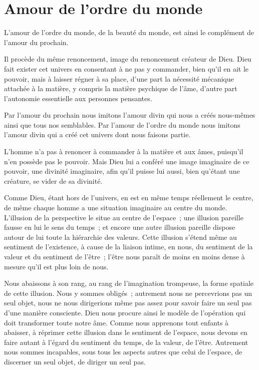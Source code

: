 \documentclass[french,twoside]{book} %
\begin{document}
\section[Amour de l’ordre du monde]{Amour de l’ordre du monde}
\noindent L'amour de l'ordre du monde, de la beauté du monde, est ainsi le complément de l'amour du prochain.\par
Il procède du même renoncement, image du renoncement créateur de Dieu. Dieu fait exister cet univers en consentant à ne pas y commander, bien qu'il en ait le pouvoir, mais à laisser régner à sa place, d'une part la nécessité mécanique attachée à la matière, y compris la matière psychique de l'âme, d'autre part l'autonomie essentielle aux personnes pensantes.\par
Par l'amour du prochain nous imitons l'amour divin qui nous a créés nous-mêmes ainsi que tous nos semblables. Par l'amour de l'ordre du monde nous imitons l'amour divin qui a créé cet univers dont nous faisons partie.\par
L'homme n'a pas à renoncer à commander à la matière et aux âmes, puisqu'il n'en possède pas le pouvoir. Mais Dieu lui a conféré une image imaginaire de ce pouvoir, une divinité imaginaire, afin qu'il puisse lui aussi, bien qu'étant une créature, se vider de sa divinité.\par
Comme Dieu, étant hors de l'univers, en est en même temps réellement le centre, de même chaque homme a une situation imaginaire au centre du monde. L'illusion de la perspective le situe au centre de l'espace ; une illusion pareille fausse en lui le sens du temps ; et encore une autre illusion pareille dispose autour de lui toute la hiérarchie des valeurs. Cette illusion s'étend même au sentiment de l'existence, à cause de la liaison intime, en nous, du sentiment de la valeur et du sentiment de l'être ; l'être nous paraît de moins en moins dense à mesure qu'il est plus loin de nous.\par
Nous abaissons à son rang, au rang de l'imagination trompeuse, la forme spatiale de cette illusion. Nous y sommes obligés ; autrement nous ne percevrions pas un seul objet, nous ne nous dirigerions même pas assez pour savoir faire un seul pas d'une manière consciente. Dieu nous procure ainsi le modèle de l'opération qui doit transformer toute notre âme. Comme nous apprenons tout enfants à abaisser, à réprimer cette illusion dans le sentiment de l'espace, nous devons en faire autant à l'égard du sentiment du temps, de la valeur, de l'être. Autrement nous sommes incapables, sous tous les aspects autres que celui de l'espace, de discerner un seul objet, de diriger un seul pas.\par
\end{document}
